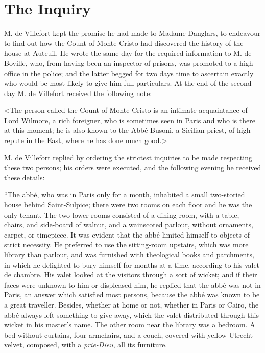 \chapter{The Inquiry} 
	
	\lettrine{M}{.} de Villefort kept the promise he had made to Madame Danglars, to endeavour to find out how the Count of Monte Cristo had discovered the history of the house at Auteuil. He wrote the same day for the required information to M. de Boville, who, from having been an inspector of prisons, was promoted to a high office in the police; and the latter begged for two days time to ascertain exactly who would be most likely to give him full particulars. At the end of the second day M. de Villefort received the following note: 

 <The person called the Count of Monte Cristo is an intimate acquaintance of Lord Wilmore, a rich foreigner, who is sometimes seen in Paris and who is there at this moment; he is also known to the Abbé Busoni, a Sicilian priest, of high repute in the East, where he has done much good.> 

 M. de Villefort replied by ordering the strictest inquiries to be made respecting these two persons; his orders were executed, and the following evening he received these details: 

 “The abbé, who was in Paris only for a month, inhabited a small two-storied house behind Saint-Sulpice; there were two rooms on each floor and he was the only tenant. The two lower rooms consisted of a dining-room, with a table, chairs, and side-board of walnut, and a wainscoted parlour, without ornaments, carpet, or timepiece. It was evident that the abbé limited himself to objects of strict necessity. He preferred to use the sitting-room upstairs, which was more library than parlour, and was furnished with theological books and parchments, in which he delighted to bury himself for months at a time, according to his valet de chambre. His valet looked at the visitors through a sort of wicket; and if their faces were unknown to him or displeased him, he replied that the abbé was not in Paris, an answer which satisfied most persons, because the abbé was known to be a great traveller. Besides, whether at home or not, whether in Paris or Cairo, the abbé always left something to give away, which the valet distributed through this wicket in his master's name. The other room near the library was a bedroom. A bed without curtains, four armchairs, and a couch, covered with yellow Utrecht velvet, composed, with a \textit{prie-Dieu}, all its furniture. 

